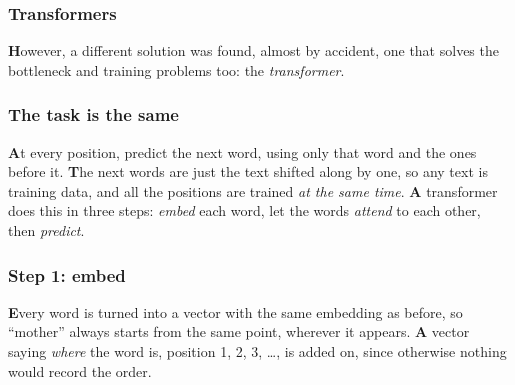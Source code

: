 \documentclass{beamer}
\begin{document}
\begin{frame}
  \frametitle{Transformers}
\vskip 0.25cm
\textbf{H}owever, a different solution was found, almost by accident, one that solves the bottleneck and training problems too: the \emph{transformer}.
\end{frame}

\begin{frame}
  \frametitle{The task is the same}
\vskip 0.2cm
\begin{center}
\end{center}
\vskip 0.2cm
\textbf{A}t every position, predict the next word, using only that word and the ones before it.
\vskip 0.2cm
\textbf{T}he next words are just the text shifted along by one, so any text is training data, and all the positions are trained \emph{at the same time}.
\vskip 0.2cm
\textbf{A} transformer does this in three steps: \emph{embed} each word, let the words \emph{attend} to each other, then \emph{predict}.
\end{frame}

\begin{frame}
  \frametitle{Step 1: embed}
\vskip 0.2cm
\begin{center}
\end{center}
\vskip 0.2cm
\textbf{E}very word is turned into a vector with the same embedding as before, so ``mother'' always starts from the same point, wherever it appears.
\vskip 0.2cm
\textbf{A} vector saying \emph{where} the word is, position 1, 2, 3, \dots, is added on, since otherwise nothing would record the order.
\end{frame}
\end{document}
